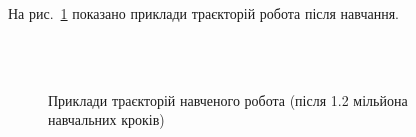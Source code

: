 \documentclass[a4paper,10pt,fleqn]{article}
\begin{document}
На рис.~\ref{fig:success-samples} показано приклади траєкторій робота після навчання.

\begin{figure}
  \centering
  \,
   \\
  \,
  \caption{Приклади траєкторій навченого робота (після 1.2 мільйона навчальних кроків)}
  \label{fig:success-samples}
\end{figure}
\end{document}
